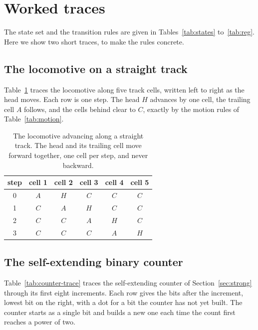 \section{Worked traces}
\label{app:tables}

The state set and the transition rules are given in Tables~\ref{tab:states} to~\ref{tab:reg}. Here we show two
short traces, to make the rules concrete.

\subsection{The locomotive on a straight track}

Table~\ref{tab:loco-trace} traces the locomotive along five track cells, written left to right as the head
moves. Each row is one step. The head $H$ advances by one cell, the trailing cell $A$ follows, and the cells
behind clear to $C$, exactly by the motion rules of Table~\ref{tab:motion}.

\begin{table}[ht]
\centering
\begin{tabular}{@{}cccccc@{}}
\toprule
step & cell 1 & cell 2 & cell 3 & cell 4 & cell 5 \\
\midrule
0 & $A$ & $H$ & $C$ & $C$ & $C$ \\
1 & $C$ & $A$ & $H$ & $C$ & $C$ \\
2 & $C$ & $C$ & $A$ & $H$ & $C$ \\
3 & $C$ & $C$ & $C$ & $A$ & $H$ \\
\bottomrule
\end{tabular}
\caption{The locomotive advancing along a straight track. The head and its trailing cell move forward together,
one cell per step, and never backward.}
\label{tab:loco-trace}
\end{table}

\subsection{The self-extending binary counter}

Table~\ref{tab:counter-trace} traces the self-extending counter of Section~\ref{sec:strong} through its first
eight increments. Each row gives the bits after the increment, lowest bit on the right, with a dot for a bit the
counter has not yet built. The counter starts as a single bit and builds a new one each time the count first
reaches a power of two.

